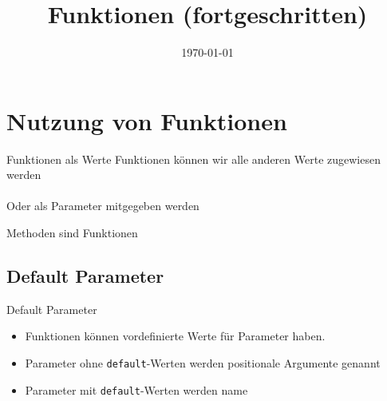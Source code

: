 

\newcommand{\topic}{
	Funktionen (fortgeschritten)
}

\title{\topic}
\supertitle{\course}
\date{\today}



\maketitle

\begin{frame}
	\tableofcontents
\end{frame}


\section{Nutzung von Funktionen}
\begin{frame}[fragile]{Funktionen als Werte}
  Funktionen k\"onnen wir alle anderen Werte zugewiesen werden\\
  

  \ \\[.25cm]
  Oder als Parameter mitgegeben werden\\
  
\end{frame}

\begin{frame}[fragile]{Methoden sind Funktionen}
  
\end{frame}


\subsection{Default Parameter}
\begin{frame}[fragile]{Default Parameter}
  \begin{itemize}
  	\item Funktionen k\"onnen vordefinierte Werte für Parameter haben.
  	\item Parameter ohne \texttt{default}-Werten werden positionale Argumente genannt
  	\item Parameter mit \texttt{default}-Werten werden name
  \end{itemize}
  
\end{frame}

